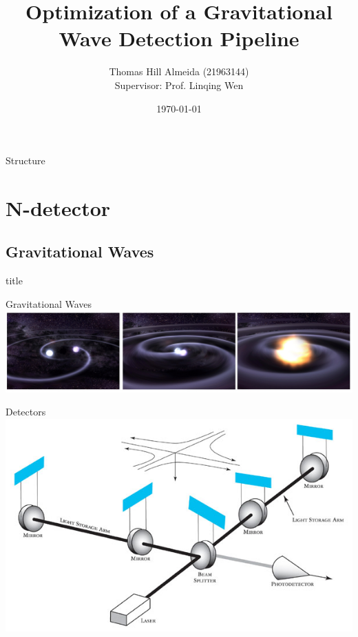 \documentclass{beamer}
\title{Optimization of a Gravitational Wave Detection Pipeline}
\author{Thomas Hill Almeida (21963144)\\
\small{Supervisor: Prof. Linqing Wen}
}
\institute{University of Western Australia \textemdash{} OzGrav}
\date{\today{}}
\begin{document}
\begin{frame}
    \maketitle
\end{frame}

\begin{frame}{Structure}
    \tableofcontents{}
\end{frame}

\section{N-detector}
\subsection{Gravitational Waves}
\begin{frame}
  \vfill
  \centering
  \begin{beamercolorbox}[sep=8pt,center,shadow=true,rounded=true]{title}
    \insertsectionhead\par%
  \end{beamercolorbox}
  \vfill
\end{frame}

\begin{frame}{Gravitational Waves}
    \centering
    \includegraphics[width=\textwidth]{inspiral_image.jpg}
\end{frame}

\begin{frame}{Detectors}
    \centering
    \includegraphics[width=\textwidth]{IFO.jpg}
\end{frame}
\end{document}
